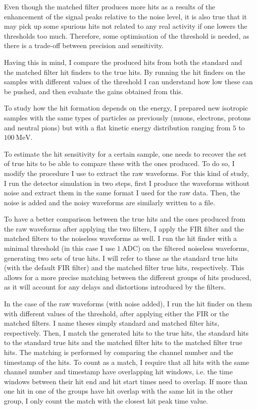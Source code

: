 Even though the matched filter produces more hits as a results of the enhancement of the signal peaks relative to the noise level, it is also true that it may pick up some spurious hits not related to any real activity if one lowers the thresholds too much. Therefore, some optimisation of the threshold is needed, as there is a trade-off between precision and sensitivity.

Having this in mind, I compare the produced hits from both the standard  and the matched filter hit finders to the true hits. By running the hit finders on the samples with different values of the threshold I can understand how low these can be pushed, and then evaluate the gains obtained from this.

To study how the hit formation depends on the energy, I prepared new isotropic samples with the same types of particles as previously (muons, electrons, protons and neutral pions) but with a flat kinetic energy distribution ranging from $5$ to $100 \ \mathrm{MeV}$.

To estimate the hit sensitivity for a certain sample, one needs to recover the set of true hits to be able to compare these with the ones produced. To do so, I modify the procedure I use to extract the raw waveforms. For this kind of study, I run the detector simulation in two steps, first I produce the waveforms without noise and extract them in the same format I used for the raw data. Then, the noise is added and the noisy waveforms are similarly written to a file.

To have a better comparison between the true hits and the ones produced from the raw waveforms after applying the two filters, I apply the FIR filter and the matched filters to the noiseless waveforms as well. I run the hit finder with a minimal threshold (in this case I use $1 \ \mathrm{ADC}$) on the filtered noiseless waveforms, generating two sets of true hits. I will refer to these as the standard true hits (with the default FIR filter) and the matched filter true hits, respectively. This allows for a more precise matching between the different groups of hits produced, as it will account for any delays and distortions introduced by the filters.

In the case of the raw waveforms (with noise added), I run the hit finder on them with different values of the threshold, after applying either the FIR or the matched filters. I name theses simply standard and matched filter hits, respectively. Then, I match the generated hits to the true hits, the standard hits to the standard true hits and the matched filter hits to the matched filter true hits. The matching is performed by comparing the channel number and the timestamp of the hits. To count as a match, I require that all hits with the same channel number and timestamp have overlapping hit windows, i.e. the time windows between their hit end and hit start times need to overlap. If more than one hit in one of the groups have hit overlap with the same hit in the other group, I only count the match with the closest hit peak time value.

